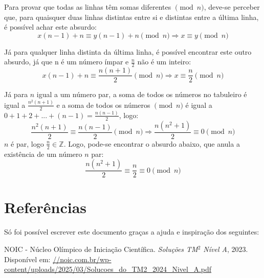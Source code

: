 \documentclass[12pt]{article}
\begin{document}
      Para provar que todas as linhas têm somas diferentes $\pmod{n}$, deve-se perceber que,
      para quaisquer duas linhas distintas entre si e distintas entre a última linha, é
      possível achar este absurdo:
      \[
        x(n-1) + n \equiv y(n-1) + n \pmod{n} \Rightarrow x \equiv y \pmod{n}
      \]

      Já para qualquer linha distinta da última linha, é possível encontrar este outro 
      absurdo, já que n é um número ímpar e $\frac{n}{2}$ não é um inteiro:
      \[
        x(n-1) + n \equiv \frac{n(n+1)}{2} \pmod{n} \Rightarrow x \equiv \frac{n}{2} \pmod{n}
      \]

      Já para $n$ igual a um número par, a soma de todos os números no tabuleiro é igual
      a $\frac{n^2(n+1)}{2}$ e a soma de todos os números $\pmod{n}$ é igual a 
      $0 + 1 + 2 + ... + (n - 1) = \frac{n(n-1)}{2}$, logo:
      \[
        \frac{n^2(n+1)}{2} \equiv \frac{n(n-1)}{2} \pmod{n} \Rightarrow \frac{n(n^2+1)}{2} \equiv 0 \pmod{n}
      \]
      $n$ é par, logo $\frac{n}{2} \in \mathbb{Z}$. Logo, pode-se encontrar o absurdo
      abaixo, que anula a existência de um número $n$ par:
      \[
        \frac{n(n^2 + 1)}{2} \equiv \frac{n}{2} \equiv 0 \pmod{n}
      \]

  \clearpage

  \section{\textsf{Referências}}

    Só foi possível escrever este documento graças a ajuda e inspiração dos seguintes:

    \renewcommand{\refname}{\vspace{-2em}}
    \begin{thebibliography}{9}
      NOIC - Núcleo Olímpico de Iniciação Científica.
      \textit{Soluções TM$^2$ Nível A}, 2023.
      Disponível em: \url{//noic.com.br/wp-content/uploads/2025/03/Solucoes_do_TM2_2024_Nivel_A.pdf}
    \end{thebibliography}
\end{document}
